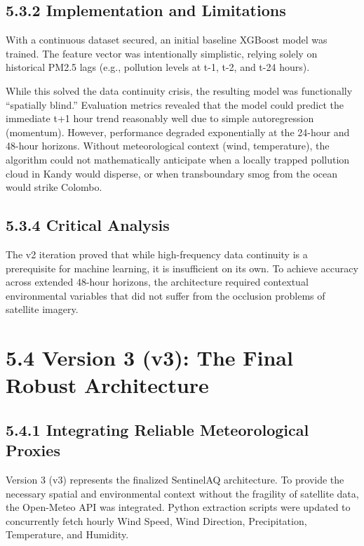 \subsection{5.3.2 Implementation and
Limitations}\label{implementation-and-limitations}

With a continuous dataset secured, an initial baseline XGBoost model was
trained. The feature vector was intentionally simplistic, relying solely
on historical PM2.5 lags (e.g., pollution levels at t-1, t-2, and t-24
hours).

While this solved the data continuity crisis, the resulting model was
functionally ``spatially blind.'' Evaluation metrics revealed that the
model could predict the immediate t+1 hour trend reasonably well due to
simple autoregression (momentum). However, performance degraded
exponentially at the 24-hour and 48-hour horizons. Without
meteorological context (wind, temperature), the algorithm could not
mathematically anticipate when a locally trapped pollution cloud in
Kandy would disperse, or when transboundary smog from the ocean would
strike Colombo.

\subsection{5.3.4 Critical Analysis}\label{critical-analysis}

The v2 iteration proved that while high-frequency data continuity is a
prerequisite for machine learning, it is insufficient on its own. To
achieve accuracy across extended 48-hour horizons, the architecture
required contextual environmental variables that did not suffer from the
occlusion problems of satellite imagery.

\section{5.4 Version 3 (v3): The Final Robust
Architecture}\label{version-3-v3-the-final-robust-architecture}

\subsection{5.4.1 Integrating Reliable Meteorological
Proxies}\label{integrating-reliable-meteorological-proxies}

Version 3 (v3) represents the finalized SentinelAQ architecture. To
provide the necessary spatial and environmental context without the
fragility of satellite data, the Open-Meteo API was integrated. Python
extraction scripts were updated to concurrently fetch hourly Wind Speed,
Wind Direction, Precipitation, Temperature, and Humidity.

